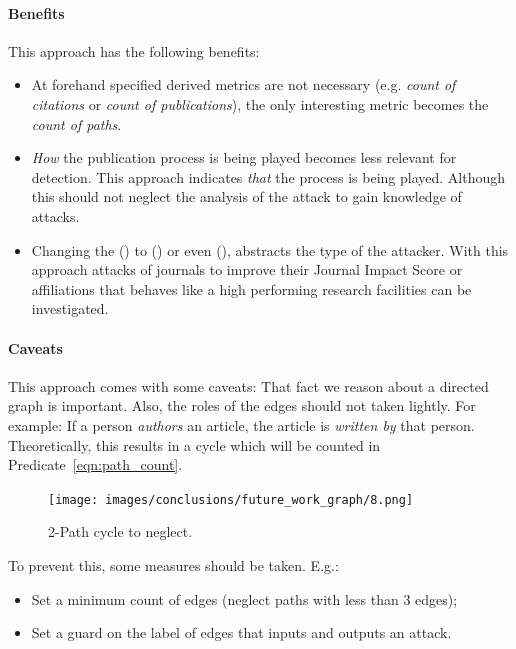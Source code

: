 \documentclass{ou-report}
\begin{document}
\paragraph{Benefits}
This approach has the following benefits:
\begin{itemize}
    \item At forehand specified derived metrics are not necessary (e.g. 
        \textit{count of citations} or \textit{count of publications}), the only 
        interesting metric becomes the \textit{count of paths}.
    \item \textit{How} the publication process is being played becomes less 
        relevant for detection. This approach indicates \textit{that} the 
        process is being played. Although this should not neglect the analysis
        of the attack to gain knowledge of attacks.
    \item Changing the \isperson() to \isjournal() or even \isaffiliation(),
        abstracts the type of the attacker. With this approach 
        attacks of journals to improve their Journal Impact Score or 
        affiliations that behaves like a high performing research facilities can
        be investigated.
\end{itemize}

\paragraph{Caveats}
This approach comes with some caveats:
That fact we reason about a directed graph is important. Also, the 
roles of the edges should not taken lightly. For example: If a person
\textit{authors} an article, the article is \textit{written by} that person. 
Theoretically, this
results in a cycle which will be counted in Predicate~\ref{eqn:path_count}.
  
\begin{figure}[H]
    \centering
    \texttt{[image: images/conclusions/future\_work\_graph/8.png]}
    \caption{2-Path cycle to neglect.}
    \label{fig:graph_8}
\end{figure}

To prevent this, some measures should be taken. E.g.:
\begin{itemize}
    \item Set a minimum count of edges (neglect paths with less than 3 edges);
    \item Set a guard on the label of edges that inputs and outputs an attack.
\end{itemize}
\end{document}
